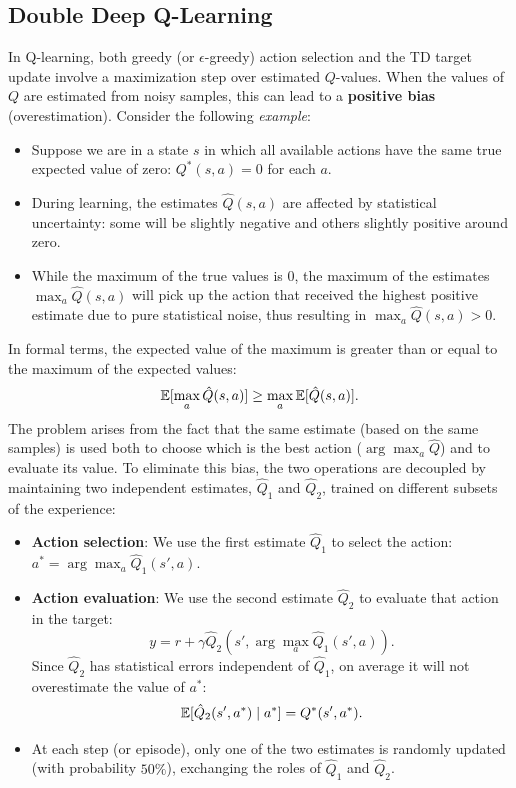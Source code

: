 \documentclass[10pt, a4paper]{report}
\begin{document}
\subsection{Double Deep Q-Learning}
In Q-learning, both greedy (or $\epsilon$-greedy) action selection and the TD target update involve a maximization step over estimated $Q$-values. When the values of $Q$ are estimated from noisy samples, this can lead to a \textbf{positive bias} (overestimation). Consider the following \textit{example}:\begin{itemize}
    \item Suppose we are in a state $s$ in which all available actions have the same true expected value of zero: $Q^*(s, a) = 0$ for each $a$.
    \item During learning, the estimates $\hat{Q}(s, a)$ are affected by statistical uncertainty: some will be slightly negative and others slightly positive around zero.
    \item While the maximum of the true values is $0$, the maximum of the estimates $\max_a \hat{Q}(s, a)$ will pick up the action that received the highest positive estimate due to pure statistical noise, thus resulting in $\max_a \hat{Q}(s, a) > 0$.
\end{itemize}
In formal terms, the expected value of the maximum is greater than or equal to the maximum of the expected values: \begin{equation}
    {\mathbb E}[\max_a \hat{Q}(s,a)] \ge \max_a {\mathbb E}[\hat{Q}(s,a)].
\end{equation}
The problem arises from the fact that the same estimate (based on the same samples) is used both to choose which is the best action ($\arg\max_a \hat{Q}$) and to evaluate its value. To eliminate this bias, the two operations are decoupled by maintaining two independent estimates, $\hat Q_1$ and $\hat Q_2$, trained on different subsets of the experience:\begin{itemize}
    \item \textbf{Action selection}: We use the first estimate $\hat Q_1$ to select the action: $a^* = \arg\max_a\hat Q_1(s', a)$.
    \item \textbf{Action evaluation}: We use the second estimate $\hat{Q}_2$ to evaluate that action in the target: \begin{equation}
        y=r+\gamma \hat{Q}_2(s',\arg\max_a\hat{Q}_1(s', a)).
    \end{equation}
     Since $\hat Q_2$ has statistical errors independent of $\hat Q_1$, on average it will not overestimate the value of $a^*$: \[{\mathbb E}[\hat Q_2(s', a^*) \mid a^*] = Q^*(s', a^*).\]
     \item At each step (or episode), only one of the two estimates is randomly updated (with probability $50\%$), exchanging the roles of $\hat Q_1$ and $\hat Q_2$.
\end{itemize}
\end{document}
